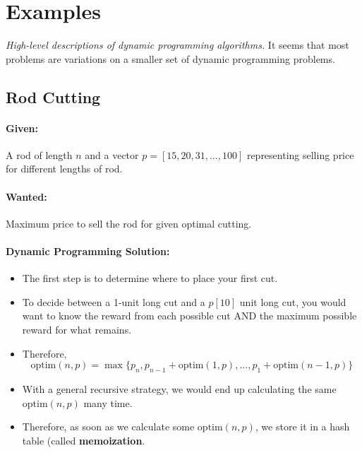 \documentclass[a4paper,12pt]{report}
\begin{document}
\section{Examples}
\textit{High-level descriptions of dynamic programming algorithms.} It seems that most problems are variations on a smaller set of dynamic programming problems. 

\subsection{Rod Cutting}
\paragraph{Given: } A rod of length $n$ and a vector $p = [15, 20, 31, ..., 100]$ representing selling price for different lengths of rod. 

\paragraph{Wanted: } Maximum price to sell the rod for given optimal cutting.

\paragraph{Dynamic Programming Solution: } 
\begin{itemize}
\item The first step is to determine where to place your first cut. 
\item To decide between a 1-unit long cut and a $p[10]$ unit long cut, you would want to know the reward from each possible cut AND the maximum possible reward for what remains. 
\item Therefore, \begin{equation}
\text{optim}(n, p) = \max\{p_n, p_{n-1} + \text{optim}(1,p), ..., p_1+\text{optim}(n-1,p)\}
\end{equation}
\item With a general recursive strategy, we would end up calculating the same $\text{optim}(n,p)$ many time. 
\item Therefore, as soon as we calculate some $\text{optim}(n,p)$, we store it in a hash table (called \textbf{memoization}. 
\end{itemize}

\end{document}

